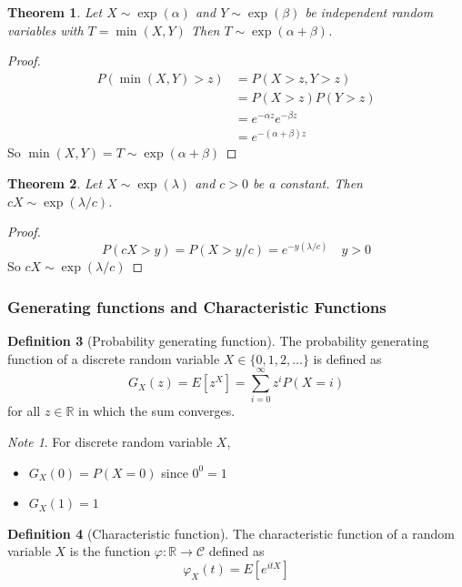 \documentclass{article}
\theoremstyle{plain}
\newtheorem{theorem}{Theorem}[section]
\theoremstyle{definition}
\newtheorem{defn}[theorem]{Definition}
\theoremstyle{remark}
\newtheorem{note}{Note}
\numberwithin{equation}{section}
\newcommand{\R}{\mathbb{R}}
\newcommand{\Cs}{\mathcal{C}}
\begin{document}
\begin{theorem}\label{thm:exp_t_cond}
Let $X \sim \exp(\alpha)$ and $Y \sim \exp(\beta)$ be independent random variables with $T = \min(X,Y)$
Then $T \sim \exp(\alpha + \beta)$.
\end{theorem}

\begin{proof}
\begin{align*}
    P(\min(X,Y) > z) &= P(X > z, Y > z)\\
    &= P(X > z) P(Y > z)\\
    &= e^{-\alpha z} e^{-\beta z}\\
    &= e^{-(\alpha + \beta) z}
\end{align*}
So $\min(X,Y) = T \sim \exp(\alpha + \beta)$
\end{proof}

\begin{theorem} \label{thm:exp_scaling}
Let $X \sim \exp(\lambda)$ and $c > 0$ be a constant.
Then $cX \sim \exp(\lambda/c)$.
\end{theorem}

\begin{proof}
$$
    P(cX > y) = P(X > y/c) = e^{-y (\lambda/c)} \quad y > 0
$$
So $cX \sim \exp(\lambda/c)$ 
\end{proof}

\subsubsection{Generating functions and Characteristic Functions}

\begin{defn}[Probability generating function]
The probability generating function of a discrete random variable $X \in \{0,1,2, \ldots\}$ is defined as 
$$
G_X(z) = E[z^X] = \sum_{i = 0}^\infty z^i P(X = i)
$$
for all $z \in \R$ in which the sum converges.
\end{defn}

\begin{note}
For discrete random variable $X$,
\begin{itemize}
    \item $G_X(0) = P(X = 0)$ since $0^0 = 1$
    \item $G_X(1) = 1$
\end{itemize}
\end{note}

\begin{defn}[Characteristic function]
The characteristic function of a random variable $X$ is the function $\varphi : \R \to \Cs$ defined as
$$
\varphi_X(t) = E[e^{itX}]
$$
\end{defn}
\end{document}
